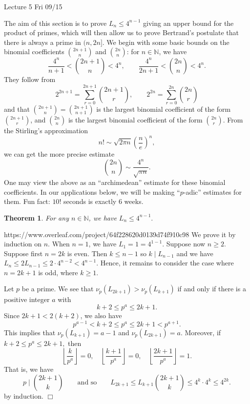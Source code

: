 \documentclass{article}
\def\N{{\mathbb N}}
\newtheorem{theorem}[subsection]{Theorem}
\newenvironment{proof}{\noindent {\bf Proof:}}{$\Box$ \vspace{2 ex}}
\newcommand{\add}[1]{{\color{blue} #1}}
\begin{document}
\begin{center}
    \add{Lecture 5 Fri 09/15}
\end{center}
The aim of this section is to prove $L_n \leq 4^{n-1}$ giving an upper bound for the product of primes, which will then allow us to prove Bertrand's postulate that there is always a prime in $(n, 2n]$. We begin with some basic bounds on the binomial coefficients $\binom{2n+1}{n}$ and $\binom{2n}{n}$: for $n\in\N$, we have
$$\frac{4^n}{n+1} < \binom{2n+1}{n} < 4^n,\qquad \frac{4^n}{2n+1} < \binom{2n}{n}< 4^n.$$
They follow from $$2^{2n+1} = \sum_{r=0}^{2n+1}\binom{2n+1}{r},\qquad 2^{2n} = \sum_{r=0}^{2n}\binom{2n}{r}$$
and that $\binom{2n+1}{n} = \binom{2n+1}{n+1}$ is the largest binomial coefficient of the form $\binom{2n+1}{r}$, and $\binom{2n}{n}$ is the largest binomial coefficient of the form $\binom{2n}{r}$. From the Stirling's approximation
$$n!\sim \sqrt{2\pi n}\left(\frac{n}{e}\right)^n,$$
we can get the more precise estimate $$\binom{2n}{n}\sim \frac{4^n}{\sqrt{\pi n}}.$$
One may view the above as an ``archimedean'' estimate for these binomial coefficients. In our applications below, we will be making ``$p$-adic'' estimates for them. Fun fact: $10!$ seconds is exactly $6$ weeks.
\begin{theorem}
    For any $n\in\N$, we have $L_n\leq 4^{n-1}.$
\end{theorem}

\begin{proof}https://www.overleaf.com/project/64f228620d0139d74f910c98
    We prove it by induction on $n$. When $n=1$, we have $L_1 = 1 = 4^{1-1}$. Suppose now $n\geq 2$. Suppose first $n = 2k$ is even. Then $k\leq n-1$ so $k\mid L_{n-1}$ and we have $L_n \leq 2L_{n-1} \leq 2\cdot 4^{n-2} < 4^{n-1}$. Hence, it remains to consider the case where $n = 2k+1$ is odd, where $k\geq 1$.

    Let $p$ be a prime. We see that $\nu_p(L_{2k+1}) > \nu_p(L_{k+1})$ if and only if there is a positive integer $a$ with $$k+2 \leq p^a \leq 2k+1.$$ Since $2k+1 < 2(k+2)$, we also have
    $$p^{a-1} < k+2 \leq p^a \leq 2k+1 < p^{a+1}.$$
    This implies that $\nu_p(L_{k+1}) = a - 1$ and $\nu_p(L_{2k+1}) = a$. %
    Moreover, if $k+2 \leq p^a \leq 2k+1,$ then
    $$\left\lfloor\frac{k}{p^a}\right\rfloor=0,\quad \left\lfloor\frac{k+1}{p^a}\right\rfloor=0,\quad\left\lfloor\frac{2k+1}{p^a}\right\rfloor=1.$$
    That is, we have $$\displaystyle p\mid \binom{2k+1}{k}\qquad\mbox{and so}\qquad L_{2k+1} \leq L_{k+1} \binom{2k+1}{k} \leq 4^k\cdot 4^k\leq 4^{2k}.$$
    by induction.
\end{proof}
\end{document}
